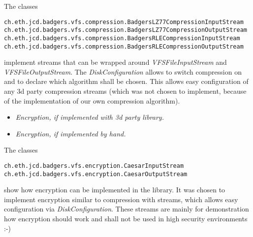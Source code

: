 The classes
\begin{verbatim}
ch.eth.jcd.badgers.vfs.compression.BadgersLZ77CompressionInputStream
ch.eth.jcd.badgers.vfs.compression.BadgersLZ77CompressionOutputStream
ch.eth.jcd.badgers.vfs.compression.BadgersRLECompressionInputStream
ch.eth.jcd.badgers.vfs.compression.BadgersRLECompressionOutputStream
\end{verbatim}
implement streams that can be wrapped around \textit{VFSFileInputStream} and
\textit{VFSFileOutputStream}. The \textit{DiskConfiguration} allows
to switch compression on and to declare which algorithm shall be chosen. This
allows easy configuration of any 3d party compression streams (which was not
chosen to implement, because of the implementation of our own compression
algorithm).

\begin{itemize}
  \item \emph{Encryption, if implemented with 3d party library.}
  \item \emph{Encryption, if implemented by hand.}
\end{itemize}

The classes
\begin{verbatim}
ch.eth.jcd.badgers.vfs.encryption.CaesarInputStream
ch.eth.jcd.badgers.vfs.encryption.CaesarOutputStream
\end{verbatim}
show how encryption can be implemented in the library. It was chosen to
implement encryption similar to compression with streams, which allows easy
configuration via \textit{DiskConfiguration}. These streams are mainly for
demonstration how encryption should work and shall not be used in high
security environments :-)
